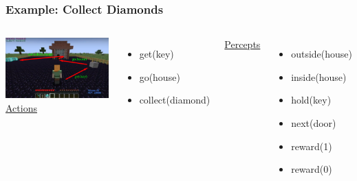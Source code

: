 \documentclass[aspectratio=169]{beamer}
\begin{document}
\begin{frame}
  \frametitle{Example: Collect Diamonds}


  \begin{columns}
    \column{4.4in}
    \includegraphics[scale=0.33]{pictures/minecraft-arrows.png}
    \column{1.7in}
    \underline{Actions}
      \begin{itemize}
      \item get(key)
      \item go(house)
      \item collect(diamond)
      \end{itemize}
    \underline{Percepts}
      \begin{itemize}
      \item outside(house)
      \item inside(house)
      \item hold(key)
      \item next(door)
      \item reward(1)
      \item reward(0)
      \end{itemize}
  \end{columns}
\end{frame}
\end{document}
